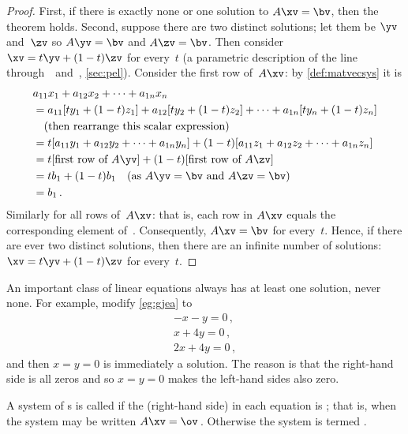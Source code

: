 \begin{proof} 
First, if there is exactly none or one solution to \(A\xv=\bv\), then the theorem holds. 
Second, suppose there are two distinct solutions; let them be \(\yv\) and~\(\zv\) so \(A\yv=\bv\) and \(A\zv=\bv\).  
Then consider \(\xv=t\yv+(1-t)\zv\) for every~\(t\) (a parametric description of the line through~\yv\ and~\zv, \cref{sec:pel}). 
Consider the first row of~\(A\xv\): by \cref{def:matvecsys} it is
\begin{align*}&
a_{11}x_1+a_{12}x_2+\cdots+a_{1n}x_n
\\&=a_{11}[ty_1+(1-t)z_1]+a_{12}[ty_2+(1-t)z_2]
+\cdots+a_{1n}[ty_n+(1-t)z_n]
\\&\quad(\text{then rearrange this scalar expression})
\\&=t[a_{11}y_1+a_{12}y_2+\cdots+a_{1n}y_n]
+(1-t)[a_{11}z_1+a_{12}z_2+\cdots+a_{1n}z_n]
\\&=t[\text{first row of }A\yv]
+(1-t)[\text{first row of }A\zv]
\\&=tb_1+(1-t)b_1 \quad(\text{as }A\yv=\bv\text{ and }A\zv=\bv)
\\&=b_1\,.
\end{align*}
Similarly for all rows of~\(A\xv\): that is, each row in \(A\xv\) equals the corresponding element of~\bv.
Consequently, \(A\xv=\bv\) for every~\(t\). 
Hence, if there are ever two distinct solutions, then there are an infinite number of solutions: \(\xv=t\yv+(1-t)\zv\) for every~\(t\).
\end{proof}




An important class of linear equations always has at least one solution, never none.
For example, modify \cref{eg:gjea} to 
\begin{equation*}
\begin{array}{l}
-x-y=0\,,\\x+4y=0\,,\\2x+4y=0\,,
\end{array}
\end{equation*}
and then \(x=y=0\) is immediately a solution.  
The reason is that the right-hand side is all zeros and so \(x=y=0\) makes the left-hand sides also zero.

\begin{definition} \label{def:homosys} 
A system of s is called  if the (right-hand side)  in each equation is ; that is, when the system may be written \(A\xv=\ov\)\,.
Otherwise the system is termed .
\end{definition}


